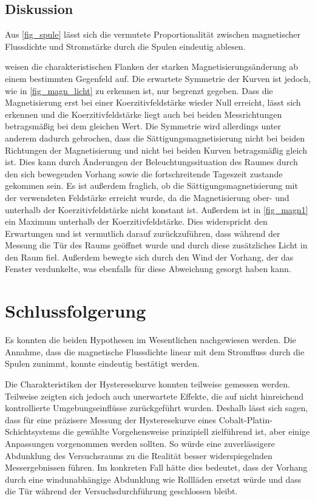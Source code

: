 \documentclass[
	a4paper,
	12pt,
	pagesize,
	ngerman
]{scrartcl}
\begin{document}
	\subsection{Diskussion}

	Aus \cref{fig_spule} lässt sich die vermutete Proportionalität zwischen magnetischer Flussdichte und Stromstärke durch die Spulen eindeutig ablesen.
	
	 weisen die charakteristischen Flanken der starken Magnetisierungsänderung ab einem bestimmten Gegenfeld auf.
	Die erwartete Symmetrie der Kurven ist jedoch, wie in \cref{fig_magn_licht} zu erkennen ist, nur begrenzt gegeben.
	Dass die Magnetisierung erst bei einer Koerzitivfeldstärke wieder Null erreicht, lässt sich erkennen und die Koerzitivfeldstärke liegt auch bei beiden Messrichtungen betragsmäßig bei dem gleichen Wert.
	Die Symmetrie wird allerdings unter anderem dadurch gebrochen, dass die Sättigungsmagnetisierung nicht bei beiden Richtungen der Magnetisierung und nicht bei beiden Kurven betragsmäßig gleich ist.
	Dies kann durch Änderungen der Beleuchtungssituation des Raumes durch den sich bewegenden Vorhang sowie die fortschreitende Tageszeit zustande gekommen sein.
	Es ist außerdem fraglich, ob die Sättigungsmagnetisierung mit der verwendeten Feldstärke erreicht wurde, da die Magnetisierung ober- und unterhalb der Koerzitivfeldstärke nicht konstant ist.
	Außerdem ist in \cref{fig_magn1} ein Maximum unterhalb der Koerzitivfeldstärke.
	Dies widerspricht den Erwartungen und ist vermutlich darauf zurückzuführen, dass während der Messung die Tür des Raums geöffnet wurde und durch diese zusätzliches Licht in den Raum fiel.
	Außerdem bewegte sich durch den Wind der Vorhang, der das Fenster verdunkelte, was ebenfalls für diese Abweichung gesorgt haben kann.
	
	\section{Schlussfolgerung}
	Es konnten die beiden Hypothesen im Wesentlichen nachgewiesen werden.
	Die Annahme, dass die magnetische Flussdichte linear mit dem Stromfluss durch die Spulen zunimmt, konnte eindeutig bestätigt werden.
	
	Die Charakteristiken der Hysteresekurve konnten teilweise gemessen werden.
	Teilweise zeigten sich jedoch auch unerwartete Effekte, die auf nicht hinreichend kontrollierte Umgebungseinflüsse zurückgeführt wurden.
	Deshalb lässt sich sagen, dass für eine präzisere Messung der Hysteresekurve eines Cobalt-Platin-Schichtsystems die gewählte Vorgehensweise prinzipiell zielführend ist, aber einige Anpassungen vorgenommen werden sollten.
	So würde eine zuverlässigere Abdunklung des Versuchsraums zu die Realität besser widerspiegelnden Messergebnissen führen.
	Im konkreten Fall hätte dies bedeutet, dass der Vorhang durch eine windunabhängige Abdunklung wie Rollläden ersetzt würde und dass die Tür während der Versuchsdurchführung geschlossen bleibt.
	
\end{document}
